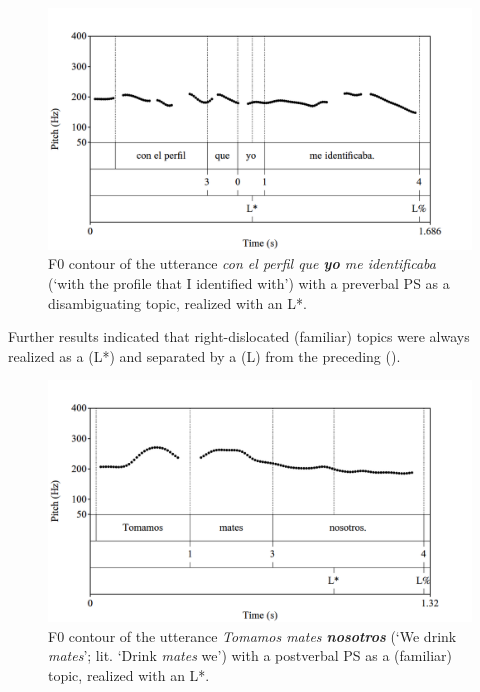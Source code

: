 \documentclass[output=paper]{langsci/langscibook}
\begin{document}
 
 \begin{figure}
\includegraphics[width=\textwidth]{figures/pes-img18.png}
\caption{F0 contour of the utterance \textit{con el perfil que \textbf{yo} me identificaba} (‘with the profile that I identified with’) with a preverbal PS as a disambiguating topic, realized with an L*.\label{fig:pes:18}}
\end{figure}

Further results indicated that right-dislocated (familiar) topics were always realized as a  (L*) and separated by a  (L\textminus{}) from the preceding  (). 



\begin{figure}
\includegraphics[width=\textwidth]{figures/pes-img19.png}
\caption{F0 contour of the utterance \textit{Tomamos mates \textbf{nosotros}} (‘We drink \textit{mates}’; lit. ‘Drink \textit{mates} we’) with a postverbal PS as a (familiar) topic, realized with an L*.\label{fig:pes:19}}
\end{figure}
\end{document}
